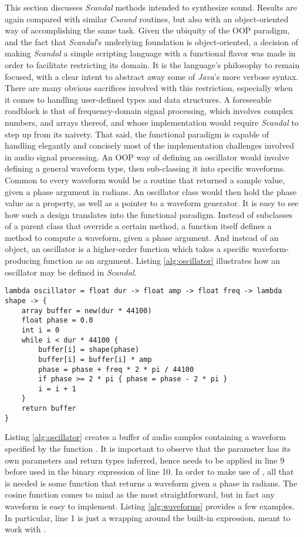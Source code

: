 This section discusses \emph{Scandal} methods intended to synthesize sound. Results are again compared with similar \emph{Csound} routines, but also with an object-oriented way of accomplishing the same task. Given the ubiquity of the OOP paradigm, and the fact that \emph{Scandal}'s underlying foundation is object-oriented, a decision of making \emph{Scandal} a simple scripting language with a functional flavor was made in order to facilitate restricting its domain. It is the language's philosophy to remain focused, with a clear intent to abstract away some of \emph{Java}'s more verbose syntax. There are many obvious sacrifices involved with this restriction, especially when it comes to handling user-defined types and data structures. A foreseeable roadblock is that of frequency-domain signal processing, which involves complex numbers, and arrays thereof, and whose implementation would require \emph{Scandal} to step up from its naivety. That said, the functional paradigm is capable of handling elegantly and concisely most of the implementation challenges involved in audio signal processing. An OOP way of defining an oscillator would involve defining a general waveform type, then sub-classing it into specific waveforms. Common to every waveform would be a routine that returned a sample value, given a phase argument in radians. An oscillator class would then hold the phase value as a property, as well as a pointer to a waveform generator. It is easy to see how such a design translates into the functional paradigm. Instead of subclasses of a parent class that override a certain method, a function itself defines a method to compute a waveform, given a phase argument. And instead of an object, an oscillator is a higher-order function which takes a specific waveform-producing function as an argument. Listing \ref{alg:oscillator} illustrates how an oscillator may be defined in \emph{Scandal}.

\begin{lstlisting}[emph={lambda,float,int,array,new,pi,while,if,return},emphstyle={\textbf},caption={Defining an oscillator.},label={alg:oscillator}]
lambda oscillator = float dur -> float amp -> float freq -> lambda shape -> {
	array buffer = new(dur * 44100)
	float phase = 0.0
	int i = 0
	while i < dur * 44100 {
		buffer[i] = shape(phase)
		buffer[i] = buffer[i] * amp
		phase = phase + freq * 2 * pi / 44100
		if phase >= 2 * pi { phase = phase - 2 * pi }
		i = i + 1
	}
	return buffer
}
\end{lstlisting}

Listing \ref{alg:oscillator} creates a buffer of audio samples containing a waveform specified by the function . It is important to observe that the parameter  has its own parameters and return types inferred, hence needs to be applied in line 9 before used in the binary expression of line 10. In order to make use of , all that is needed is some function that returns a waveform given a phase in radians. The cosine function comes to mind as the most straightforward, but in fact any waveform is easy to implement. Listing \ref{alg:waveforms} provides a few examples. In particular, line 1 is just a wrapping around the built-in  expression, meant to work with .

